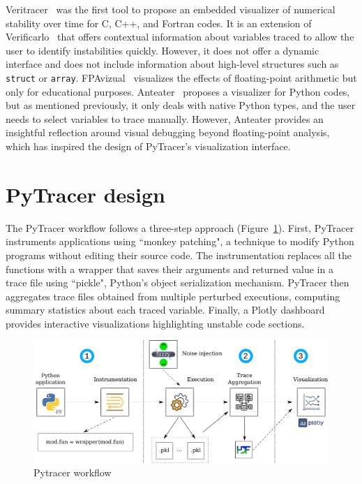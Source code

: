 \documentclass[11pt]{article}
\newcommand{\tristan}[1]{\color{orange}\textbf{From Tristan:} #1\color{black}\xspace}
\newcommand{\pytracer}[0]{PyTracer\xspace}
\begin{document}
Veritracer~\cite{chatelain2018veritracer} was the first tool to propose an embedded visualizer of numerical stability over time for C, C++, and Fortran codes. It is an extension of Verificarlo~\cite{verificarlo} that offers contextual information about variables traced to allow the user to identify instabilities quickly.
However, it does not offer a dynamic interface and does not include information about high-level structures such as \texttt{struct} or \texttt{array}.
FPAvizual~\cite{gu2014fpavisual} visualizes the effects of floating-point arithmetic but only for educational purposes.
Anteater~\cite{faust2019anteater} proposes a visualizer for Python codes, but as mentioned previously, it only deals with native Python types, and the user needs to select variables to trace manually. However, Anteater provides an insightful reflection 
around visual debugging beyond floating-point analysis, which has inspired the design of \pytracer's visualization interface.



\section{\pytracer design}


The PyTracer workflow follows a three-step approach (Figure~\ref{fig:workflow}). First, \pytracer instruments applications using ``monkey patching", a technique to modify Python programs without editing their source code. The instrumentation replaces all the functions with a wrapper that saves their arguments and returned value in a trace file using ``pickle", Python's object serialization mechanism. \pytracer then aggregates trace files obtained from multiple perturbed executions, computing summary statistics about each traced variable. Finally, a Plotly dashboard provides interactive visualizations highlighting unstable code sections.


\begin{figure}
    \centering
    \includegraphics[width=\linewidth]{figure/workflow.pdf}
    \caption{Pytracer workflow}
    \label{fig:workflow}
\end{figure}
\end{document}
